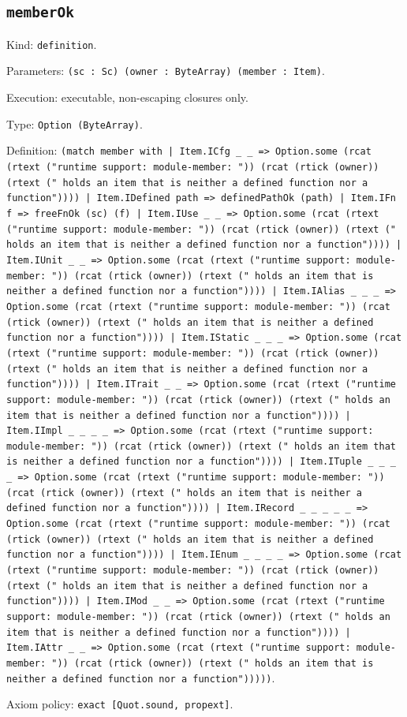 \documentclass[11pt]{article}
\begin{document}
\subsection*{\texttt{memberOk}}
\noindent Kind: \texttt{definition}.\par
\noindent Parameters: \texttt{(sc : Sc) (owner : ByteArray) (member : Item)}.\par
\noindent Execution: executable, non-escaping closures only.\par
\noindent Type: \texttt{Option (ByteArray)}.\par
\noindent Definition: \texttt{(match member with | Item.ICfg \_ \_ => Option.some (rcat (rtext ("runtime support: module-member: ")) (rcat (rtick (owner)) (rtext (" holds an item that is neither a defined function nor a function")))) | Item.IDefined path => definedPathOk (path) | Item.IFn f => freeFnOk (sc) (f) | Item.IUse \_ \_ => Option.some (rcat (rtext ("runtime support: module-member: ")) (rcat (rtick (owner)) (rtext (" holds an item that is neither a defined function nor a function")))) | Item.IUnit \_ \_ => Option.some (rcat (rtext ("runtime support: module-member: ")) (rcat (rtick (owner)) (rtext (" holds an item that is neither a defined function nor a function")))) | Item.IAlias \_ \_ \_ => Option.some (rcat (rtext ("runtime support: module-member: ")) (rcat (rtick (owner)) (rtext (" holds an item that is neither a defined function nor a function")))) | Item.IStatic \_ \_ \_ => Option.some (rcat (rtext ("runtime support: module-member: ")) (rcat (rtick (owner)) (rtext (" holds an item that is neither a defined function nor a function")))) | Item.ITrait \_ \_ => Option.some (rcat (rtext ("runtime support: module-member: ")) (rcat (rtick (owner)) (rtext (" holds an item that is neither a defined function nor a function")))) | Item.IImpl \_ \_ \_ \_ => Option.some (rcat (rtext ("runtime support: module-member: ")) (rcat (rtick (owner)) (rtext (" holds an item that is neither a defined function nor a function")))) | Item.ITuple \_ \_ \_ \_ => Option.some (rcat (rtext ("runtime support: module-member: ")) (rcat (rtick (owner)) (rtext (" holds an item that is neither a defined function nor a function")))) | Item.IRecord \_ \_ \_ \_ \_ => Option.some (rcat (rtext ("runtime support: module-member: ")) (rcat (rtick (owner)) (rtext (" holds an item that is neither a defined function nor a function")))) | Item.IEnum \_ \_ \_ \_ => Option.some (rcat (rtext ("runtime support: module-member: ")) (rcat (rtick (owner)) (rtext (" holds an item that is neither a defined function nor a function")))) | Item.IMod \_ \_ => Option.some (rcat (rtext ("runtime support: module-member: ")) (rcat (rtick (owner)) (rtext (" holds an item that is neither a defined function nor a function")))) | Item.IAttr \_ \_ => Option.some (rcat (rtext ("runtime support: module-member: ")) (rcat (rtick (owner)) (rtext (" holds an item that is neither a defined function nor a function")))))}.\par
\noindent Axiom policy: \texttt{exact [Quot.sound, propext]}.\par
\end{document}
